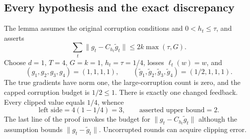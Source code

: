 \documentclass[10pt]{article}
\begin{document}
\subsection*{Every hypothesis and the exact discrepancy}
The lemma assumes the original corruption conditions and \(0<h_t\le\tau\), and asserts \[\sum_t\|g_t-C_{h_t}\widetilde g_t\|\le2k\max(\tau,G).\] Choose \(d=1\), \(T=4\), \(G=k=1\), \(h_t=\tau=1/4\), losses \(\ell_t(w)=w\), and \[(g_1,g_2,g_3,g_4)=(1,1,1,1),\qquad
 (\widetilde g_1,\widetilde g_2,\widetilde g_3,\widetilde g_4)=(1/2,1,1,1).\] The true gradients have norm one, the large-corruption count is zero, and the capped corruption budget is \(1/2\le1\). There is exactly one changed feedback. Every clipped value equals \(1/4\), whence \[\text{left side}=4(1-1/4)=3,\qquad
 \text{asserted upper bound}=2.\] The last line of the proof invokes the budget for \(\|g_t-C_{h_t}\widetilde g_t\|\) although the assumption bounds \(\|g_t-\widetilde g_t\|\). Uncorrupted rounds can acquire clipping error.\par
\end{document}
